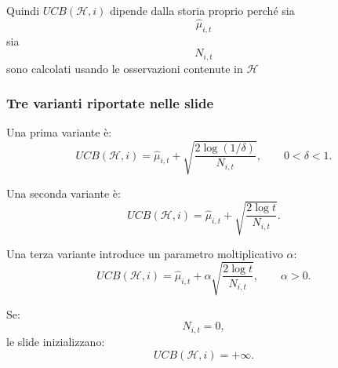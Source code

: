 Quindi \(UCB(\mathcal H,i)\) dipende dalla storia proprio perché sia
\[
\widehat{\mu}_{i,t}
\]
sia
\[
N_{i,t}
\]
sono calcolati usando le osservazioni contenute in \(\mathcal H\)

\subsubsection{Tre varianti riportate nelle slide}

Una prima variante è:
\[
UCB(\mathcal{H},i)
=
\widehat{\mu}_{i,t}
+
\sqrt{
\frac{
2\log(1/\delta)
}{
N_{i,t}
}
},
\qquad
0<\delta<1.
\]

Una seconda variante è:
\[
UCB(\mathcal{H},i)
=
\widehat{\mu}_{i,t}
+
\sqrt{
\frac{
2\log t
}{
N_{i,t}
}
}.
\]

Una terza variante introduce un parametro moltiplicativo $\alpha$:
\[
UCB(\mathcal{H},i)
=
\widehat{\mu}_{i,t}
+
\alpha
\sqrt{
\frac{
2\log t
}{
N_{i,t}
}
},
\qquad
\alpha>0.
\]

Se:
\[
N_{i,t}=0,
\]
le slide inizializzano:
\[
UCB(\mathcal{H},i)=+\infty.
\]



